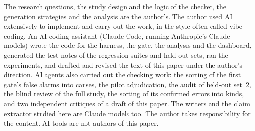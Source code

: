 \documentclass[11pt]{article}
\begin{document}
The research questions, the study design and the logic of the checker, the generation strategies and the analysis are the author's. The author used AI extensively to implement and carry out the work, in the style often called vibe coding. An AI coding assistant (Claude Code, running Anthropic's Claude models) wrote the code for the harness, the gate, the analysis and the dashboard, generated the test notes of the regression suites and held-out sets, ran the experiments, and drafted and revised the text of this paper under the author's direction. AI agents also carried out the checking work: the sorting of the first gate's false alarms into causes, the pilot adjudication, the audit of held-out set~2, the blind review of the full study, the sorting of its confirmed errors into kinds, and two independent critiques of a draft of this paper. The writers and the claim extractor studied here are Claude models too. The author takes responsibility for the content. AI tools are not authors of this paper.



\end{document}
